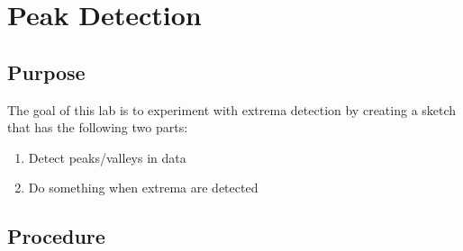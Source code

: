 \chapter{Peak Detection}



\section{Purpose}
The goal of this lab is to experiment with extrema detection by creating a sketch
that has the following two parts:
\begin{enumerate}
    \item Detect peaks/valleys in data 
    \item Do something when extrema are detected
\end{enumerate}



\section{Procedure}

